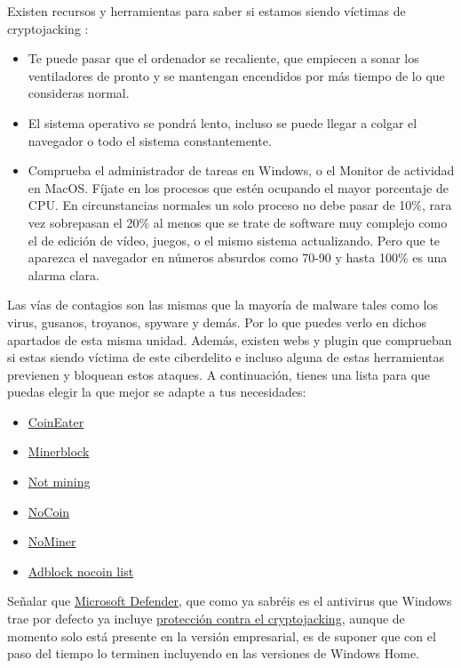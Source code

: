 \documentclass[
  a4paper,
  openany]{book}
\begin{document}
Existen recursos y herramientas para saber si estamos siendo víctimas de cryptojacking \citep{GEN-guia-cryptojacking}:

\begin{itemize}
\item
  Te puede pasar que el ordenador se recaliente, que empiecen a sonar los ventiladores de pronto y se mantengan encendidos por más tiempo de lo que consideras normal.
\item
  El sistema operativo se pondrá lento, incluso se puede llegar a colgar el navegador o todo el sistema constantemente.
\item
  Comprueba el administrador de tareas en Windows, o el Monitor de actividad en MacOS. Fíjate en los procesos que estén ocupando el mayor porcentaje de CPU. En circunstancias normales un solo proceso no debe pasar de 10\%, rara vez sobrepasan el 20\% al menos que se trate de software muy complejo como el de edición de vídeo, juegos, o el mismo sistema actualizando. Pero que te aparezca el navegador en números absurdos como 70-90 y hasta 100\% es una alarma clara.
\end{itemize}

Las vías de contagios son las mismas que la mayoría de malware tales como los virus, gusanos, troyanos, spyware y demás. Por lo que puedes verlo en dichos apartados de esta misma unidad. Además, existen webs y plugin que comprueban si estas siendo víctima de este ciberdelito e incluso alguna de estas herramientas previenen y bloquean estos ataques. A continuación, tienes una lista para que puedas elegir la que mejor se adapte a tus necesidades:

\begin{itemize}
\item
  \href{https://github.com/fhstp/CoinEater}{CoinEater}
\item
  \href{https://github.com/xd4rker/MinerBlock}{Minerblock}
\item
  \href{https://notmining.es}{Not mining}
\item
  \href{https://github.com/keraf/NoCoin}{NoCoin}
\item
  \href{https://chrome.google.com/webstore/detail/nominer-block-coin-miners/jfnangjojcioomickmmnfmiadkfhcdmd}{NoMiner}
\item
  \href{https://github.com/hoshsadiq/adblock-nocoin-list}{Adblock nocoin list}
\end{itemize}

Señalar que \href{https://www.microsoft.com/es-es/windows/comprehensive-security}{Microsoft Defender}, que como ya sabréis es el antivirus que Windows trae por defecto ya incluye \href{https://www.microsoft.com/security/blog/2021/04/26/defending-against-cryptojacking-with-microsoft-defender-for-endpoint-and-intel-tdt/}{protección contra el cryptojacking}, aunque de momento solo está presente en la versión empresarial, es de suponer que con el paso del tiempo lo terminen incluyendo en las versiones de Windows Home.
\end{document}
